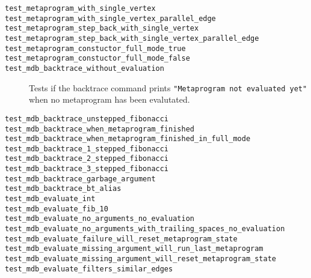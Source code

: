 \begin{description}
    \item[\texttt{test\_metaprogram\_with\_single\_vertex}]
    \item[\texttt{test\_metaprogram\_with\_single\_vertex\_parallel\_edge}]
    \item[\texttt{test\_metaprogram\_step\_back\_with\_single\_vertex}]
    \item[\texttt{test\_metaprogram\_step\_back\_with\_single\_vertex\_parallel\_edge}]
    \item[\texttt{test\_metaprogram\_constuctor\_full\_mode\_true}]
    \item[\texttt{test\_metaprogram\_constuctor\_full\_mode\_false}]
    \item[\texttt{test\_mdb\_backtrace\_without\_evaluation}]
        Tests if the backtrace command prints
        \texttt{"Metaprogram not evaluated yet"} when no metaprogram has been
        evalutated.
    \item[\texttt{test\_mdb\_backtrace\_unstepped\_fibonacci}]
    \item[\texttt{test\_mdb\_backtrace\_when\_metaprogram\_finished}]
    \item[\texttt{test\_mdb\_backtrace\_when\_metaprogram\_finished\_in\_full\_mode}]
    \item[\texttt{test\_mdb\_backtrace\_1\_stepped\_fibonacci}]
    \item[\texttt{test\_mdb\_backtrace\_2\_stepped\_fibonacci}]
    \item[\texttt{test\_mdb\_backtrace\_3\_stepped\_fibonacci}]
    \item[\texttt{test\_mdb\_backtrace\_garbage\_argument}]
    \item[\texttt{test\_mdb\_backtrace\_bt\_alias}]
    \item[\texttt{test\_mdb\_evaluate\_int}]
    \item[\texttt{test\_mdb\_evaluate\_fib\_10}]
    \item[\texttt{test\_mdb\_evaluate\_no\_arguments\_no\_evaluation}]
    \item[\texttt{test\_mdb\_evaluate\_no\_arguments\_with\_trailing\_spaces\_no\_evaluation}]
    \item[\texttt{test\_mdb\_evaluate\_failure\_will\_reset\_metaprogram\_state}]
    \item[\texttt{test\_mdb\_evaluate\_missing\_argument\_will\_run\_last\_metaprogram}]
    \item[\texttt{test\_mdb\_evaluate\_missing\_argument\_will\_reset\_metaprogram\_state}]
    \item[\texttt{test\_mdb\_evaluate\_filters\_similar\_edges}]

\end{description}
